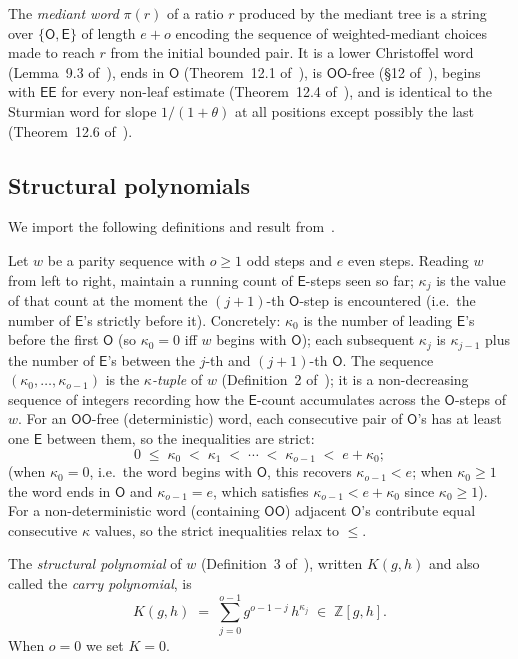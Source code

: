 \documentclass[12pt]{article}
\theoremstyle{definition}
\theoremstyle{remark}
\theoremstyle{plain}
\newcommand{\ZZ}{\mathbb{Z}}
\newcommand{\OO}{\mathsf{O}}
\newcommand{\EE}{\mathsf{E}}
\begin{document}
The \emph{mediant word} $\pi(r)$ of a ratio $r$ produced by the mediant tree is a
string over $\{\OO, \EE\}$ of length $e + o$ encoding the sequence of weighted-mediant
choices made to reach $r$ from the initial bounded pair.
It is a lower Christoffel word (Lemma~9.3 of~\cite{paper76}), ends in $\OO$
(Theorem~12.1 of~\cite{paper76}), is $\OO\OO$-free (§12 of~\cite{paper76}),
begins with $\EE\EE$ for every non-leaf estimate (Theorem~12.4 of~\cite{paper76}),
and is identical to the Sturmian word for slope $1/(1+\theta)$ at all positions
except possibly the last (Theorem~12.6 of~\cite{paper76}).

\subsection{Structural polynomials~\texorpdfstring{\cite{paper71}}{[paper71]}}
\label{sec:structpoly}

We import the following definitions and result from~\cite{paper71}.

Let $w$ be a parity sequence with $o \geq 1$ odd steps and $e$ even steps.
Reading $w$ from left to right, maintain a running count of $\EE$-steps seen so far;
$\kappa_j$ is the value of that count at the moment the $(j+1)$-th $\OO$-step is
encountered (i.e.\ the number of $\EE$'s strictly before it).
Concretely: $\kappa_0$ is the number of leading $\EE$'s before the first $\OO$
(so $\kappa_0 = 0$ iff $w$ begins with $\OO$); each subsequent $\kappa_j$ is
$\kappa_{j-1}$ plus the number of $\EE$'s between the $j$-th and $(j+1)$-th $\OO$.
The sequence $(\kappa_0, \ldots, \kappa_{o-1})$ is the \emph{$\kappa$-tuple} of $w$
(Definition~2 of~\cite{paper71}); it is a non-decreasing sequence of integers
recording how the $\EE$-count accumulates across the $\OO$-steps of $w$.
For an $\OO\OO$-free (deterministic) word, each consecutive pair of $\OO$'s has at
least one $\EE$ between them, so the inequalities are strict:
\[
  0 \;\leq\; \kappa_0 \;<\; \kappa_1 \;<\; \cdots \;<\; \kappa_{o-1} \;<\; e + \kappa_0;
\]
(when $\kappa_0 = 0$, i.e.\ the word begins with $\OO$, this recovers
$\kappa_{o-1} < e$; when $\kappa_0 \geq 1$ the word ends in $\OO$ and
$\kappa_{o-1} = e$, which satisfies $\kappa_{o-1} < e + \kappa_0$ since
$\kappa_0 \geq 1$).
For a non-deterministic word (containing $\OO\OO$) adjacent $\OO$'s contribute
equal consecutive $\kappa$ values, so the strict inequalities relax to $\leq$.

The \emph{structural polynomial} of $w$ (Definition~3 of~\cite{paper71}), written
$K(g, h)$ and also called the \emph{carry polynomial}, is
\[
  K(g, h) \;=\; \sum_{j=0}^{o-1} g^{o-1-j}\, h^{\kappa_j} \;\in\; \ZZ[g,h].
\]
When $o = 0$ we set $K = 0$.
\end{document}
